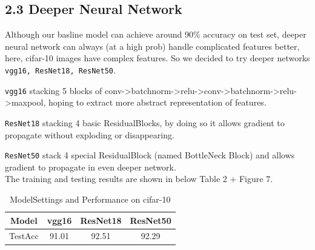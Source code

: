 \documentclass{article}
\newcommand{\subs}[1]{\subsection*{#1}}
\begin{document}
\subs{2.3 Deeper Neural Network}
Although our basline model can achieve around 90\% accuracy on test set, deeper neural network can always (at a high prob) handle complicated features better, here, cifar-10 images have complex features. So we decided to try deeper networks \texttt{vgg16, ResNet18, ResNet50}.

\texttt{vgg16} stacking 5 blocks of conv->batchnorm->relu->conv->batchnorm->relu->maxpool, hoping to extract more abstract representation of features.

\texttt{ResNet18} stacking 4 basic ResidualBlocks, by doing so it allows gradient to propagate without exploding or disappearing.

\texttt{ResNet50} stack 4 special ResidualBlock (named BottleNeck Block) and allows gradient to propagate in even deeper network.\\

\noindent The training and testing results are shown in below Table 2 + Figure 7.

\begin{table}[htbp]
  \centering
  \caption{ModelSettings and Performance on cifar-10}
  \label{tab:model-compare}
  \begin{tabular}{|c|ccc|} 
    \hline
    Model & vgg16 & ResNet18 & ResNet50  \\
    \hline
    TestAcc & 91.01 & 92.51 & 92.29  \\
    \hline
  \end{tabular} 
\end{table}
\end{document}
